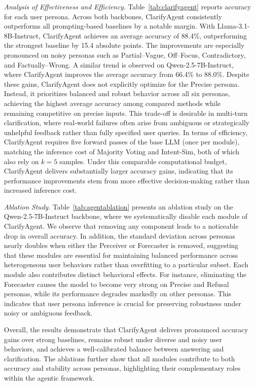 \documentclass[sigconf]{acmart}
\newcommand{\model}{ClarifyAgent\xspace}
\begin{document}
\textit{Analysis of Effectiveness and Efficiency.}
Table~\ref{tab:clarifyagent} reports accuracy for each user persona. 
Across both backbones, \model{} consistently outperforms all prompting-based baselines by a notable margin.
With Llama-3.1-8B-Instruct, \model{} achieves an average accuracy of 88.4\%, outperforming the strongest baseline by 15.4 absolute points.
The improvements are especially pronounced on noisy personas such as Partial--Vague, Off--Focus, Contradictory, and Factually--Wrong.
A similar trend is observed on Qwen-2.5-7B-Instruct, where \model{} improves the average accuracy from 66.4\% to 88.0\%.
Despite these gains, \model{} does not explicitly optimize for the Precise persona.
Instead, it prioritizes balanced and robust behavior across all six personas, achieving the highest average accuracy among compared methods while remaining competitive on precise inputs.
This trade-off is desirable in multi-turn clarification, where real-world failures often arise from ambiguous or strategically unhelpful feedback rather than fully specified user queries.
In terms of efficiency, \model{} requires five forward passes of the base LLM (once per module), matching the inference cost of Majority Voting and Intent-Sim, both of which also rely on $k{=}5$ samples.
Under this comparable computational budget, \model{} delivers substantially larger accuracy gains, indicating that its performance improvements stem from more effective decision-making rather than increased inference cost.

\textit{Ablation Study.}
Table~\ref{tab:agentablation} presents an ablation study on the Qwen-2.5-7B-Instruct backbone, where we systematically disable each module of \model.
We observe that removing any component leads to a noticeable drop in overall accuracy.
In addition, the standard deviation across personas nearly doubles when either the Perceiver or Forecaster is removed, suggesting that these modules are essential for maintaining balanced performance across heterogeneous user behaviors rather than overfitting to a particular subset.
Each module also contributes distinct behavioral effects.
For instance, eliminating the Forecaster causes the model to become very strong on Precise and Refusal personas, while its performance degrades markedly on other personas.
This indicates that user persona inference is crucial for preserving robustness under noisy or ambiguous feedback.

Overall, the results demonstrate that \model{} delivers pronounced accuracy gains over strong baselines, remains robust under diverse and noisy user behaviors, and achieves a well-calibrated balance between answering and clarification.
The ablations further show that all modules contribute to both accuracy and stability across personas, highlighting their complementary roles within the agentic framework.
\end{document}
